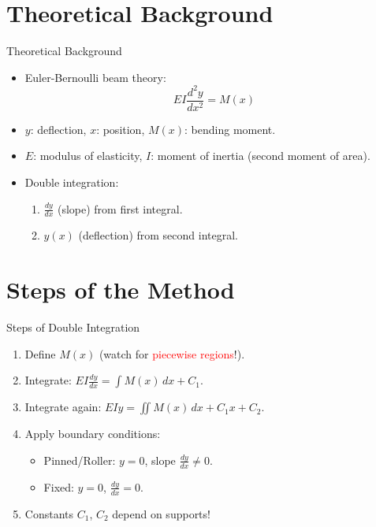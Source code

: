 \documentclass{beamer}
\begin{document}
\section{Theoretical Background}
\begin{frame}{Theoretical Background}
    \begin{itemize}
        \item Euler-Bernoulli beam theory:
        \[
        EI \frac{d^2y}{dx^2} = M(x)
        \]
        \item \( y \): deflection, \( x \): position, \( M(x) \): bending moment.
        \item \( E \): modulus of elasticity, \( I \): moment of inertia (second moment of area).
        \item Double integration:
        \begin{enumerate}
            \item \( \frac{dy}{dx} \) (slope) from first integral.
            \item \( y(x) \) (deflection) from second integral.
        \end{enumerate}
    \end{itemize}
\end{frame}

\section{Steps of the Method}
\begin{frame}{Steps of Double Integration}
    \begin{enumerate}
        \item Define \( M(x) \) (watch for \textcolor{red}{piecewise regions}!).
        \item Integrate: \( EI \frac{dy}{dx} = \int M(x) \, dx + C_1 \).
        \item Integrate again: \( EI y = \iint M(x) \, dx + C_1 x + C_2 \).
        \item Apply boundary conditions:
        \begin{itemize}
            \item Pinned/Roller: \( y = 0 \), slope \( \frac{dy}{dx} \neq 0 \).
            \item Fixed: \( y = 0 \), \( \frac{dy}{dx} = 0 \).
        \end{itemize}
        \item Constants \( C_1 \), \( C_2 \) depend on supports!
    \end{enumerate}
\end{frame}
\end{document}
